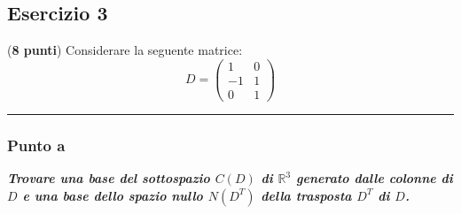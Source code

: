 \documentclass[a4paper]{article}
\newcommand{\longline}{\noindent\rule{\textwidth}{0.4pt}}
\begin{document}
	\subsection{Esercizio 3}

	(\textbf{8 punti}) Considerare la seguente matrice:
	\begin{equation*}
		D = \begin{pmatrix}
			1 & 0 \\
			-1 & 1 \\
			0 & 1
		\end{pmatrix}
	\end{equation*}
	
	\longline

	\subsubsection{Punto a}

	\textcolor{Green4}{\textbf{\emph{Trovare una base del sottospazio $C\left(D\right)$ di $\mathbb{R}^{3}$ generato dalle colonne di $D$ e una base dello spazio nullo $N\left(D^{T}\right)$ della trasposta $D^{T}$ di $D$.}}}\newline
\end{document}
